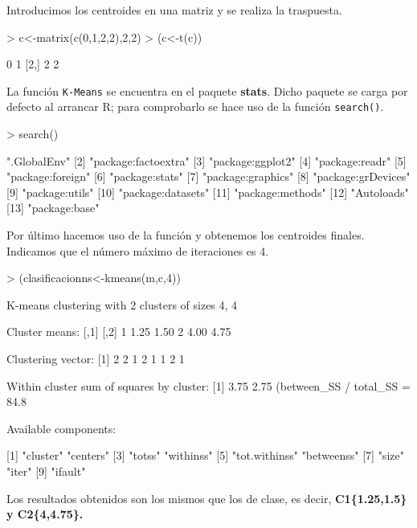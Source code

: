 \documentclass [a4paper] {article}
\begin{document}
\bigskip
Introducimos los centroides en una matriz y se realiza la traspuesta.
\begin{Schunk}
\begin{Sinput}
> c<-matrix(c(0,1,2,2),2,2)
> (c<-t(c))
\end{Sinput}
\begin{Soutput}
     [,1] [,2]
[1,]    0    1
[2,]    2    2
\end{Soutput}
\end{Schunk}

\bigskip
La función \texttt{K-Means} se encuentra en el paquete \textbf{stats}. Dicho paquete se carga por defecto al
arrancar R; para comprobarlo se hace uso de la función \texttt{search()}.
\begin{Schunk}
\begin{Sinput}
> search()
\end{Sinput}
\begin{Soutput}
 [1] ".GlobalEnv"        
 [2] "package:factoextra"
 [3] "package:ggplot2"   
 [4] "package:readr"     
 [5] "package:foreign"   
 [6] "package:stats"     
 [7] "package:graphics"  
 [8] "package:grDevices" 
 [9] "package:utils"     
[10] "package:datasets"  
[11] "package:methods"   
[12] "Autoloads"         
[13] "package:base"      
\end{Soutput}
\end{Schunk}

\bigskip
Por último hacemos uso de la función y obtenemos los centroides finales. Indicamos que el número máximo de
iteraciones es 4.
\begin{Schunk}
\begin{Sinput}
> (clasificacionns<-kmeans(m,c,4))
\end{Sinput}
\begin{Soutput}
K-means clustering with 2 clusters of sizes 4, 4

Cluster means:
  [,1] [,2]
1 1.25 1.50
2 4.00 4.75

Clustering vector:
[1] 2 2 1 2 1 1 2 1

Within cluster sum of squares by cluster:
[1] 3.75 2.75
 (between_SS / total_SS =  84.8 %

Available components:

[1] "cluster"      "centers"     
[3] "totss"        "withinss"    
[5] "tot.withinss" "betweenss"   
[7] "size"         "iter"        
[9] "ifault"      
\end{Soutput}
\end{Schunk}

\bigskip
Los resultados obtenidos son los mismos que los de clase, es decir, \textbf{C1\{1.25,1.5\} y C2\{4,4.75\}.}
\end{document}
